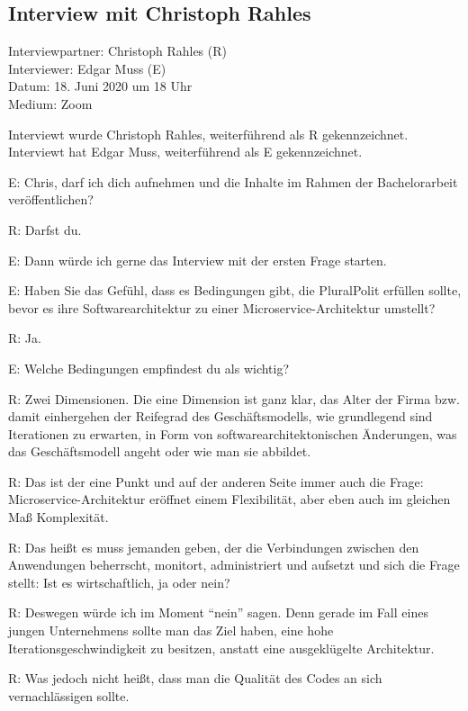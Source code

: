 \subsection{Interview mit Christoph Rahles}
\label{appendix:rahles}

Interviewpartner: Christoph Rahles (R) \\
Interviewer: Edgar Muss (E) \\
Datum: 18. Juni 2020 um 18 Uhr \\
Medium: Zoom

Interviewt wurde Christoph Rahles, weiterführend als R gekennzeichnet. Interviewt hat Edgar Muss, weiterführend als E gekennzeichnet.

E: Chris, darf ich dich aufnehmen und die Inhalte im Rahmen der Bachelorarbeit veröffentlichen?

R: Darfst du.

E: Dann würde ich gerne das Interview mit der ersten Frage starten.

E: Haben Sie das Gefühl, dass es Bedingungen gibt, die PluralPolit erfüllen sollte, bevor es ihre Softwarearchitektur zu einer Microservice-Architektur umstellt?

R: Ja.

E: Welche Bedingungen empfindest du als wichtig?

\label{appendix:r-1}
R: Zwei Dimensionen. Die eine Dimension ist ganz klar, das Alter der Firma bzw. damit einhergehen der Reifegrad des Geschäftsmodells, wie grundlegend sind Iterationen zu erwarten, in Form von softwarearchitektonischen Änderungen, was das Geschäftsmodell angeht oder wie man sie abbildet.

\label{appendix:r-2}
R: Das ist der eine Punkt und auf der anderen Seite immer auch die Frage: Microservice-Architektur eröffnet einem Flexibilität, aber eben auch im gleichen Maß Komplexität.

\label{appendix:r-3}
R: Das heißt es muss  jemanden geben, der die Verbindungen zwischen den Anwendungen beherrscht, monitort, administriert und aufsetzt und sich die Frage stellt: Ist es wirtschaftlich, ja oder nein?

\label{appendix:r-4}
R: Deswegen würde ich im Moment \enquote{nein} sagen. Denn gerade im Fall eines jungen Unternehmens sollte man das Ziel haben, eine hohe Iterationsgeschwindigkeit zu besitzen, anstatt eine ausgeklügelte Architektur.

\label{appendix:r-5}
R: Was jedoch nicht heißt, dass man die Qualität des Codes an sich vernachlässigen sollte.

